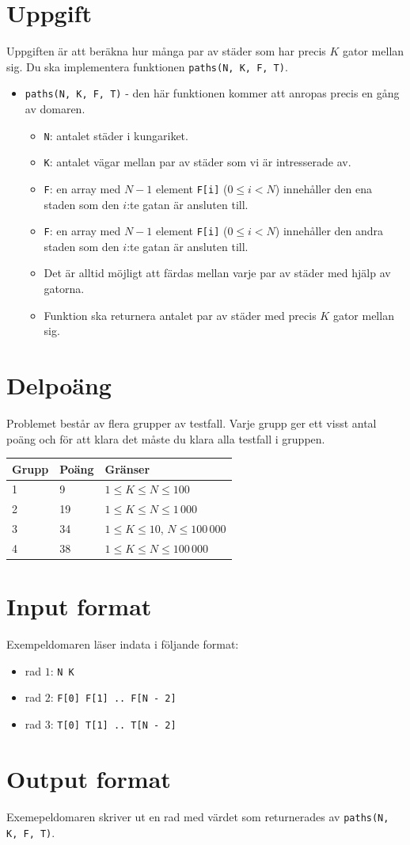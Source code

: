 \section*{Uppgift}
Uppgiften är att beräkna hur många par av städer som har precis $K$ gator mellan sig. Du ska implementera funktionen \texttt{paths(N, K, F, T)}.
\begin{itemize}
  \item \texttt{paths(N, K, F, T)} - den här funktionen kommer att anropas precis en gång av domaren.
  \begin{itemize}
    \item \texttt{N}: antalet städer i kungariket.
    \item \texttt{K}: antalet vägar mellan par av städer som vi är intresserade av.
    \item \texttt{F}: en array med $N-1$ element \texttt{F[i]} ($0 \le i < N$) innehåller den ena staden som den $i$:te gatan är ansluten till.
    \item \texttt{F}: en array med $N-1$ element \texttt{F[i]} ($0 \le i < N$) innehåller den andra staden som den $i$:te gatan är ansluten till.
    \item Det är alltid möjligt att färdas mellan varje par av städer med hjälp av gatorna.
    \item Funktion ska returnera antalet par av städer med precis $K$ gator mellan sig.
  \end{itemize}
\end{itemize}

\section*{Delpoäng}
Problemet består av flera grupper av testfall. Varje grupp ger ett visst antal poäng och för att klara det måste du klara alla testfall i gruppen.

\begin{tabular}{|l|l|l|}
  \hline
  \textbf{Grupp} & \textbf{Poäng} & \textbf{Gränser} \\ \hline
  1 & 9 & $1 \le K \le N \le 100$ \\ \hline
  2 & 19 & $1 \le K \le N \le 1\,000$ \\ \hline
  3 & 34 & $1 \le K \le 10$, $N \le 100\,000$ \\ \hline
  4 & 38 & $1 \le K \le N \le 100\,000$ \\ \hline
\end{tabular}

\section*{Input format}
Exempeldomaren läser indata i följande format:

\begin{itemize}
  \item rad $1$: \texttt{N K}
  \item rad $2$: \texttt{F[0] F[1] .. F[N - 2]}
  \item rad $3$: \texttt{T[0] T[1] .. T[N - 2]}
\end{itemize}

\section*{Output format}
Exemepeldomaren skriver ut en rad med värdet som returnerades av \texttt{paths(N, K, F, T)}.
